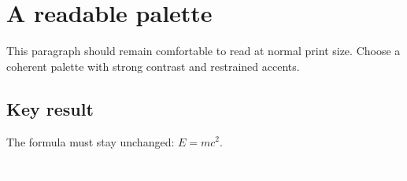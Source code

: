 \documentclass[12pt]{article}
\begin{document}
\section*{\textcolor{accent}{A readable palette}}
This paragraph should remain comfortable to read at normal print size.
Choose a coherent palette with strong contrast and restrained accents.

\subsection*{\textcolor{accent}{Key result}}
The formula must stay unchanged: $E=mc^2$.

\noindent\colorbox{accent}{\textcolor{white}{A highlighted label}}
\end{document}

